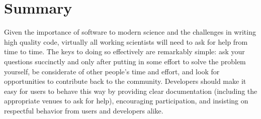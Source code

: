 \documentclass[9pt,training,ASAPversion]{livecoms}
\begin{document}
\section{Summary}

Given the importance of software to modern science and the challenges in writing
high quality code, virtually all working scientists will need to ask for help
from time to time. The keys to doing so effectively are remarkably simple: ask
your questions succinctly and only after putting in some effort to solve the
problem yourself, be considerate of other people's time and effort, and look for
opportunities to contribute back to the community. Developers should make it
easy for users to behave this way by providing clear documentation (including
the appropriate venues to ask for help), encouraging participation, and
insisting on respectful behavior from users and developers alike.
\end{document}
